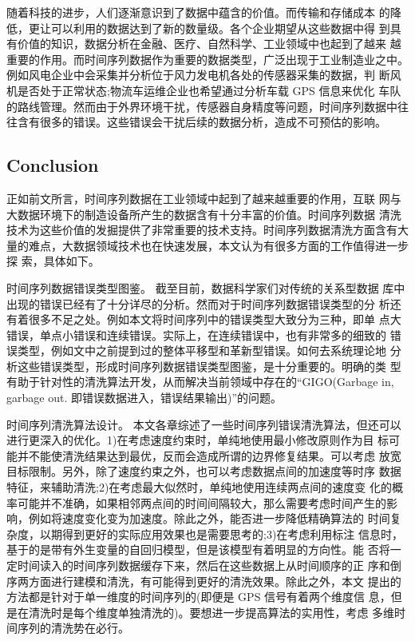 \documentclass{article}
\begin{document}
随着科技的进步，人们逐渐意识到了数据中蕴含的价值。而传输和存储成本 的降低，更让可以利用的数据达到了新的数量级。各个企业期望从这些数据中得 到具有价值的知识，数据分析在金融、医疗、自然科学、工业领域中也起到了越来 越重要的作用。而时间序列数据作为重要的数据类型，广泛出现于工业制造业之中。例如风电企业中会采集并分析位于风力发电机各处的传感器采集的数据，判 断风机是否处于正常状态;物流车运维企业也希望通过分析车载 GPS 信息来优化 车队的路线管理。然而由于外界环境干扰，传感器自身精度等问题，时间序列数据中往往含有很多的错误。这些错误会干扰后续的数据分析，造成不可预估的影响。 


\subsection{Conclusion}
正如前文所言，时间序列数据在工业领域中起到了越来越重要的作用，互联 网与大数据环境下的制造设备所产生的数据含有十分丰富的价值。时间序列数据 清洗技术为这些价值的发掘提供了非常重要的技术支持。时间序列数据清洗方面含有大量的难点，大数据领域技术也在快速发展，本文认为有很多方面的工作值得进一步探 索，具体如下。 

\par 时间序列数据错误类型图鉴。 截至目前，数据科学家们对传统的关系型数据 库中出现的错误已经有了十分详尽的分析。然而对于时间序列数据错误类型的分 析还有着很多不足之处。例如本文将时间序列中的错误类型大致分为三种，即单 点大错误，单点小错误和连续错误。实际上，在连续错误中，也有非常多的细致的 错误类型，例如文中之前提到过的整体平移型和革新型错误。如何去系统理论地 分析这些错误类型，形成时间序列数据错误类型图鉴，是十分重要的。明确的类 型有助于针对性的清洗算法开发，从而解决当前领域中存在的“GIGO(Garbage in, garbage out. 即错误数据进入，错误结果输出)”的问题。 

\par 时间序列清洗算法设计。 本文各章综述了一些时间序列错误清洗算法，但还可以进行更深入的优化。1)在考虑速度约束时，单纯地使用最小修改原则作为目 标可能并不能使清洗结果达到最优，反而会造成所谓的边界修复结果。可以考虑 放宽目标限制。另外，除了速度约束之外，也可以考虑数据点间的加速度等时序 数据特征，来辅助清洗;2)在考虑最大似然时，单纯地使用连续两点间的速度变 化的概率可能并不准确，如果相邻两点间的时间间隔较大，那么需要考虑时间产生的影响，例如将速度变化变为加速度。除此之外，能否进一步降低精确算法的 时间复杂度，以期得到更好的实际应用效果也是需要思考的;3)在考虑利用标注 信息时，基于的是带有外生变量的自回归模型，但是该模型有着明显的方向性。能 否将一定时间读入的时间序列数据缓存下来，然后在这些数据上从时间顺序的正 序和倒序两方面进行建模和清洗，有可能得到更好的清洗效果。除此之外，本文 提出的方法都是针对于单一维度的时间序列的(即便是 GPS 信号有着两个维度信 息，但是在清洗时是每个维度单独清洗的)。要想进一步提高算法的实用性，考虑 多维时间序列的清洗势在必行。 
\end{document}
